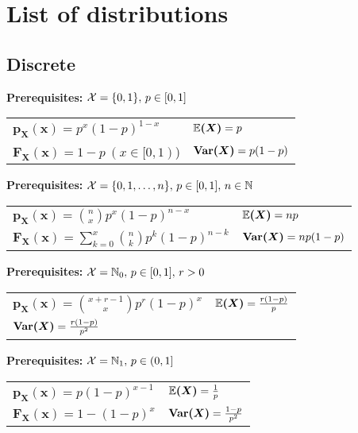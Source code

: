 \section{List of distributions}
\subsection*{Discrete}

\renewcommand{\arraystretch}{1.8}
\begin{ddefinition*}
  \textbf{Prerequisites:} \(\operatorname{\mathcal{X}} = \{0, 1\}, \, p \in [0, 1]\) \\
  \begin{tabularx}{\linewidth}{@{}ll@{}}
    \(\bm{p_X(x)} = p^x(1 - p)^{1 - x}\) & \(\bm{\mathbb{E}(X)} = p\) \\
    \(\bm{F_X(x)} = 1 - p \ (x \in [0, 1)\)) & \(\bm{\Var(X)} = p(1 - p)\)
  \end{tabularx}
\end{ddefinition*}

\begin{ddefinition*}
  \textbf{Prerequisites:} \(\operatorname{\mathcal{X}} = \{0, 1, \ldots, n\}, \, p \in [0, 1], \, n \in \mathbb{N}\) \\
  \begin{tabularx}{\linewidth}{@{}ll@{}}
    \(\bm{p_X(x)} = \binom{n}{x}p^x(1 - p)^{n - x}\) & \(\bm{\mathbb{E}(X)} = np\) \\
    \(\bm{F_X(x)} = \sum\limits_{k = 0}^x \binom{n}{k}p^k (1-p)^{n-k}\) & \(\bm{\Var(X)} = np(1 - p)\)
  \end{tabularx}
\end{ddefinition*}

\begin{ddefinition*}
  \textbf{Prerequisites:} \(\operatorname{\mathcal{X}} = \mathbb{N}_0, \, p \in [0, 1], \, r > 0\) \\
  \begin{tabularx}{\linewidth}{@{}ll@{}}
    \(\bm{p_X(x)} = \binom{x + r - 1}{x}p^r(1 - p)^x\) & \(\bm{\mathbb{E}(X)} = \frac{r(1 - p)}{p}\) \\
    \(\bm{\Var(X)} = \frac{r(1 - p)}{p^2}\)
  \end{tabularx}
\end{ddefinition*}

\begin{ddefinition*}
  \textbf{Prerequisites:} \(\operatorname{\mathcal{X}} = \mathbb{N}_1, \, p \in (0, 1]\) \\
  \begin{tabularx}{\linewidth}{@{}ll@{}}
    \(\bm{p_X(x)} = p(1-p)^{x-1}\) & \(\bm{\mathbb{E}(X)} = \frac{1}{p}\) \\
    \(\bm{F_X(x)} = 1 - (1 - p)^x\) & \(\bm{\Var(X)} = \frac{1 - p}{p^2}\)
  \end{tabularx}
\end{ddefinition*}

